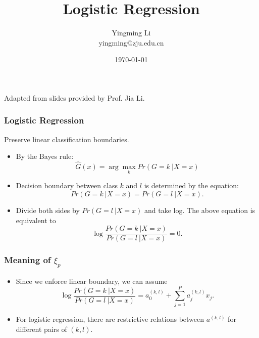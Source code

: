 \documentclass[12pt,notes,mathserif]{beamer}
\title[]{\LARGE Logistic Regression
}
\author[YingmingLi]{Yingming Li \\ yingming@zju.edu.cn}
\institute[DSERC, ZJU]{Data Science \& Engineering Research Center, ZJU}
\date[\today]{\today}
\begin{document}

\begin{frame}[c]
	\titlepage
	\begin{center}
		Adapted from slides provided by Prof. Jia Li.
	\end{center}
\end{frame}

\begin{frame}[c]
	\frametitle{Logistic Regression}
	Preserve linear classification boundaries.
	\begin{itemize}
		\item  By the Bayes rule:
		      \begin{equation*}
			      \hat{G}(x)=\arg\max\limits_{k} Pr(G=k~|X=x)
		      \end{equation*}
		\item  Decision boundary between class $k$ and $l$ is determined by the equation:
		      \begin{equation*}
			      Pr(G=k~|X=x)=Pr(G=l~|X=x).
		      \end{equation*}
		\item  Divide both sides by $Pr(G = l~| X = x)$ and take log. The
		      above equation is equivalent to
		      \begin{equation*}
			      \log \dfrac{Pr(G=k~|X=x)}{Pr(G=l~|X=x)}=0.
		      \end{equation*}
	\end{itemize}
\end{frame}

\begin{frame}[c]
	\frametitle{Meaning of $\xi_p$}
	\begin{itemize}
		\item
		      Since we enforce linear boundary, we can assume
		      \begin{equation*}
			      \log \dfrac{Pr(G=k~|X=x)}{Pr(G=l~|X=x)}=a_0^{(k,l)}+\sum\limits_{j=1}^{P}a_j^{(k,l)}x_j.
		      \end{equation*}
		\item
		      For logistic regression, there are restrictive relations between $a^{(k,l)}$ for different pairs of $(k,l)$.
	\end{itemize}
\end{frame}
\end{document}
